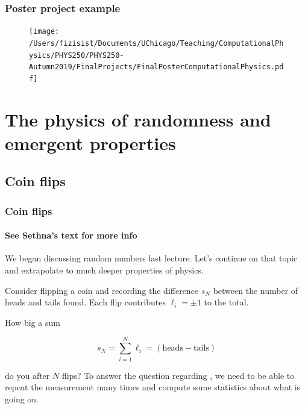 \documentclass[hyperref={colorlinks=true}]{beamer}
\begin{document}

\begin{frame}%
  \frametitle{Poster project example}
  
  \begin{figure}
    \texttt{[image: /Users/fizisist/Documents/UChicago/Teaching/ComputationalPhysics/PHYS250/PHYS250-Autumn2019/FinalProjects/FinalPosterComputationalPhysics.pdf]}
  \end{figure}
  
\end{frame}

\section[The physics of randomness and emergent properties]{The physics of randomness and emergent properties}

\subsection[Coin flips]{Coin flips}

\begin{frame}%
  \frametitle{Coin flips}
  \framesubtitle{See Sethna's text for more info}
  
  We began discussing random numbers last lecture. Let's continue on that topic and extrapolate to much deeper properties of physics.
  
  \vspace{1cm}
  
  Consider flipping a coin and recording the difference $s_N$ between the number of heads and tails found. Each flip contributes $\ell_i = \pm 1$ to the total. 
  
  How big a sum 
  
  \begin{equation} 
    s_N = \sum_{i=1}^{N} \ell_i = \mathrm{(heads - tails)} 
  \end{equation}
  
  do you  after $N$ flips? To answer the question regarding , we need to be able to repeat the measurement many times and compute some statistics about what is going on.
  
\end{frame}
\end{document}
